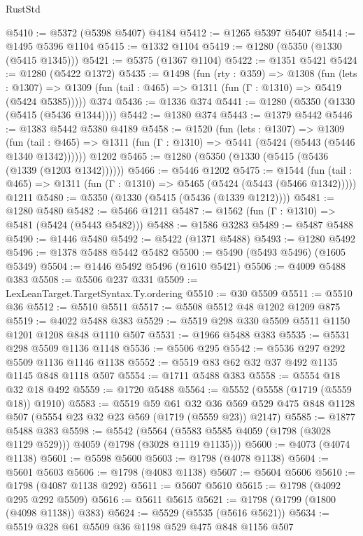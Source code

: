 \begin{lexlean}{RustStd}
\begin{coremodule}
@5410 := @5372 (@5398 @5407) @4184
@5412 := @1265 @5397 @5407
@5414 := @1495 @5396 @1104
@5415 := @1332 @1104
@5419 := @1280 (@5350 (@1330 (@5415 @1345)))
@5421 := @5375 (@1367 @1104)
@5422 := @1351 @5421
@5424 := @1280 (@5422 @1372)
@5435 := @1498
    (fun (rty : @359) =>
    @1308
      (fun (lets : @1307) =>
      @1309 (fun (tail : @465) => @1311 (fun (Γ : @1310) => @5419 (@5424 @5385)))))
    @374
@5436 := @1336 @374
@5441 := @1280 (@5350 (@1330 (@5415 (@5436 @1344))))
@5442 := @1380 @374
@5443 := @1379 @5442
@5446 := @1383 @5442 @5380 @4189
@5458 := @1520
    (fun (lets : @1307) =>
    @1309
      (fun (tail : @465) => @1311 (fun (Γ : @1310) => @5441 (@5424 (@5443 (@5446 @1340 @1342))))))
    @1202
@5465 := @1280 (@5350 (@1330 (@5415 (@5436 (@1339 (@1203 @1342))))))
@5466 := @5446 @1202
@5475 := @1544
    (fun (tail : @465) => @1311 (fun (Γ : @1310) => @5465 (@5424 (@5443 (@5466 @1342)))))
    @1211
@5480 := @5350 (@1330 (@5415 (@5436 (@1339 @1212))))
@5481 := @1280 @5480
@5482 := @5466 @1211
@5487 := @1562 (fun (Γ : @1310) => @5481 (@5424 (@5443 @5482)))
@5488 := @1586 @3283
@5489 := @5487 @5488
@5490 := @1446 @5480
@5492 := @5422 (@1371 @5488)
@5493 := @1280 @5492
@5496 := @1378 @5488 @5442 @5482
@5500 := @5490 (@5493 @5496) (@1605 @5349)
@5504 := @1446 @5492 @5496 (@1610 @5421)
@5506 := @4009 @5488 @383
@5508 := @5506 @237 @331
@5509 := LexLeanTarget.TargetSyntax.Ty.ordering
@5510 := @30 @5509
@5511 := @5510 @36
@5512 := @5510 @5511
@5517 := @5508 @5512 @48 @1202 @1209 @875
@5519 := @4022 @5488 @383
@5529 := @5519 @298 @330 @5509 @5511 @1150 @1201 @1208 @848 @1110 @507
@5531 := @1966 @5488 @383
@5535 := @5531 @298 @5509 @1136 @1148
@5536 := @5506 @295
@5542 := @5536 @297 @292 @5509 @1136 @1146 @1138
@5552 := @5519 @83 @62 @32 @37 @492 @1135 @1145 @848 @1118 @507
@5554 := @1711 @5488 @383
@5558 := @5554 @18 @32 @18 @492
@5559 := @1720 @5488
@5564 := @5552 (@5558 (@1719 (@5559 @18)) @1910)
@5583 := @5519
    @59
    @61
    @32
    @36
    @569
    @529
    @475
    @848
    @1128
    @507
    (@5554 @23 @32 @23 @569 (@1719 (@5559 @23)) @2147)
@5585 := @1877 @5488 @383
@5598 := @5542
    (@5564 (@5583 @5585 @4059 (@1798 (@3028 @1129 @529))) @4059 (@1798 (@3028 @1119 @1135)))
@5600 := @4073 (@4074 @1138)
@5601 := @5598 @5600
@5603 := @1798 (@4078 @1138)
@5604 := @5601 @5603
@5606 := @1798 (@4083 @1138)
@5607 := @5604 @5606
@5610 := @1798 (@4087 @1138 @292)
@5611 := @5607 @5610
@5615 := @1798 (@4092 @295 @292 @5509)
@5616 := @5611 @5615
@5621 := @1798 (@1799 (@1800 (@4098 @1138)) @383)
@5624 := @5529 (@5535 (@5616 @5621))
@5634 := @5519 @328 @61 @5509 @36 @1198 @529 @475 @848 @1156 @507

\end{coremodule}
\end{lexlean}
